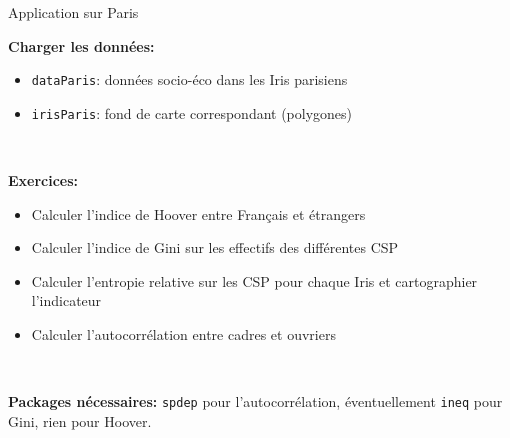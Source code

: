 \begin{frame}[fragile]{Application sur Paris}

\textbf{Charger les données:}

\begin{itemize}
  \item \texttt{dataParis}: données socio-éco dans les Iris parisiens
  \item \texttt{irisParis}: fond de carte correspondant (polygones)
\end{itemize}

~

\textbf{Exercices:}

\begin{itemize}
  \item Calculer l'indice de Hoover entre Français et étrangers
  \item Calculer l'indice de Gini sur les effectifs des différentes CSP
  \item Calculer l'entropie relative sur les CSP pour chaque Iris et cartographier l'indicateur
  \item Calculer l'autocorrélation entre cadres et ouvriers
\end{itemize}

~

\textbf{Packages nécessaires:} \texttt{spdep} pour l'autocorrélation, éventuellement \texttt{ineq} pour Gini, rien pour Hoover.

\end{frame}

